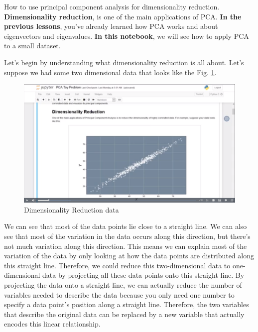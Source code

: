 How to use principal component analysis for dimensionality reduction.
\textbf{Dimensionality reduction}, is one of the main applications of
PCA. \textbf{In the previous lessons}, you've already learned how PCA
works and about eigenvectors and eigenvalues. \textbf{In this notebook},
we will see how to apply PCA to a small dataset.

Let's begin by understanding what dimensionality reduction is all about.
Let's suppose we had some two dimensional data that looks like the Fig.
\ref{fig:dimensionality_reduction}.

\begin{figure}[htp]
  \centering
  \includegraphics[width=\linewidth]{img/dimensionality_reduction.png}
  \caption{Dimensionality Reduction data}
  \label{fig:dimensionality_reduction}
\end{figure}

We can see that most of the data points lie close to a straight line. We
can also see that most of the variation in the data occurs along this
direction, but there's not much variation along this direction. This
means we can explain most of the variation of the data by only looking
at how the data points are distributed along this straight line.
Therefore, we could reduce this two-dimensional data to one-dimensional
data by projecting all these data points onto this straight line. By
projecting the data onto a straight line, we can actually reduce the
number of variables needed to describe the data because you only need
one number to specify a data point's position along a straight line.
Therefore, the two variables that describe the original data can be
replaced by a new variable that actually encodes this linear
relationship.

